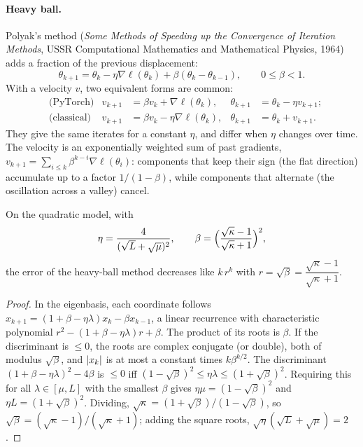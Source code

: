 \begin{notechapter}
\paragraph{Heavy ball.} Polyak's method (\emph{Some Methods of Speeding up the Convergence of
Iteration Methods}, USSR Computational Mathematics and Mathematical Physics, 1964) adds a
fraction of the previous displacement:
\[
  \theta_{k+1} = \theta_k - \eta\nabla\ell(\theta_k) + \beta(\theta_k - \theta_{k-1}),\qquad0\leq\beta<1 .
\]
With a velocity $v$, two equivalent forms are common:
\begin{align*}
  &\text{(PyTorch)} & v_{k+1} &= \beta v_k + \nabla\ell(\theta_k), & \theta_{k+1} &= \theta_k - \eta v_{k+1};\\
  &\text{(classical)} & v_{k+1} &= \beta v_k - \eta\nabla\ell(\theta_k), & \theta_{k+1} &= \theta_k + v_{k+1} .
\end{align*}
They give the same iterates for a constant $\eta$, and differ when $\eta$ changes over time. The
velocity is an exponentially weighted sum of past gradients, $v_{k+1} = \sum_{i\leq k}\beta^{k-i}\nabla\ell(\theta_i)$: components
that keep their sign (the flat direction) accumulate up to a factor $1/(1 - \beta)$, while components
that alternate (the oscillation across a valley) cancel.

\begin{theorem}\label{optimizers:thm:hb}
On the quadratic model, with
\[
  \eta = \frac4{(\sqrt L + \sqrt\mu)^2},\qquad\beta = \Bigl(\frac{\sqrt\kappa - 1}{\sqrt\kappa + 1}\Bigr)^2,
\]
the error of the heavy-ball method decreases like $k\,r^k$ with $r = \sqrt\beta = \dfrac{\sqrt\kappa - 1}{\sqrt\kappa + 1}$.
\end{theorem}

\begin{proof}
In the eigenbasis, each coordinate follows $x_{k+1} = (1 + \beta - \eta\lambda)x_k - \beta x_{k-1}$, a linear recurrence with
characteristic polynomial $r^2 - (1 + \beta - \eta\lambda)r + \beta$. The product of its roots is $\beta$. If the discriminant is
$\leq0$, the roots are complex conjugate (or double), both of modulus $\sqrt\beta$, and $\left|x_k\right|$ is at most a
constant times $k\beta^{k/2}$. The discriminant $(1 + \beta - \eta\lambda)^2 - 4\beta$ is $\leq0$ iff $(1 - \sqrt\beta)^2\leq\eta\lambda\leq(1 + \sqrt\beta)^2$. Requiring
this for all $\lambda\in[\mu,L]$ with the smallest $\beta$ gives $\eta\mu = (1 - \sqrt\beta)^2$ and $\eta L = (1 + \sqrt\beta)^2$. Dividing,
$\sqrt\kappa = (1 + \sqrt\beta)/(1 - \sqrt\beta)$, so $\sqrt\beta = (\sqrt\kappa - 1)/(\sqrt\kappa + 1)$; adding the square roots, $\sqrt\eta(\sqrt L + \sqrt\mu) = 2$.
\end{proof}


\end{notechapter}
